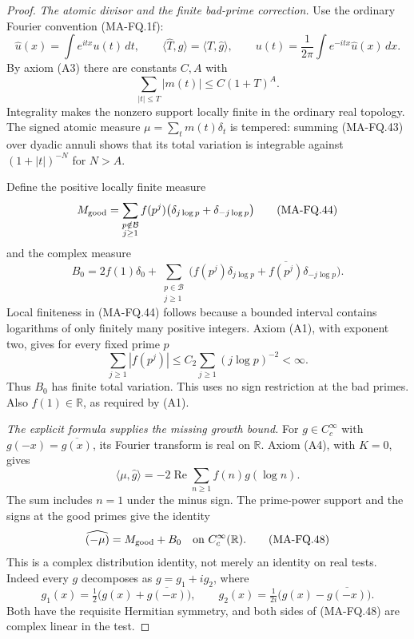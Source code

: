 \begin{proof}
\emph{The atomic divisor and the finite bad-prime correction.}
Use the ordinary Fourier convention (MA-FQ.1f):
\[
 \widehat u(x)=\int e^{itx}u(t)\,dt,\qquad
 \langle\widehat T,g\rangle=\langle T,\widehat g\rangle,
 \qquad
 u(t)=\frac1{2\pi}\int e^{-itx}\widehat u(x)\,dx.
 \tag{MA-FQ.42}
\]
By axiom (A3) there are constants $C,A$ with
\[
 \sum_{|t|\le T}|m(t)|\le C(1+T)^A.
 \tag{MA-FQ.43}
\]
Integrality makes the nonzero support locally finite in
the ordinary real topology. The signed atomic measure
$\mu=\sum_t m(t)\delta_t$ is tempered: summing (MA-FQ.43)
over dyadic annuli shows that its total variation is
integrable against $(1+|t|)^{-N}$ for $N>A$.

Define the positive locally finite measure
\[
 M_{\rm good}
   =\sum_{\substack{p\notin\mathcal B\\j\ge1}}
        f(p^j)\bigl(\delta_{j\log p}+\delta_{-j\log p}\bigr)
 \tag{MA-FQ.44}
\]
and the complex measure
\[
 B_0=2f(1)\delta_0+
    \sum_{\substack{p\in\mathcal B\\j\ge1}}
       \bigl(f(p^j)\delta_{j\log p}
                    +\overline{f(p^j)}\delta_{-j\log p}\bigr).
 \tag{MA-FQ.45}
\]
Local finiteness in (MA-FQ.44) follows because a bounded
interval contains logarithms of only finitely many
positive integers. Axiom (A1), with exponent two, gives
for every fixed prime $p$
\[
 \sum_{j\ge1}|f(p^j)|
       \le C_2\sum_{j\ge1}(j\log p)^{-2}<\infty.
 \tag{MA-FQ.46}
\]
Thus $B_0$ has finite total variation. This uses no sign
restriction at the bad primes. Also $f(1)\in\mathbb R$,
as required by (A1).

\emph{The explicit formula supplies the missing growth bound.}
For $g\in C_c^\infty$ with $g(-x)=\overline{g(x)}$,
its Fourier transform is real on $\mathbb R$.
Axiom (A4), with $K=0$, gives
\[
 \langle\mu,\widehat g\rangle
            =-2\operatorname{Re}
                    \sum_{n\ge1}f(n)g(\log n).
 \tag{MA-FQ.47}
\]
The sum includes $n=1$ under the minus sign. The
prime-power support and the signs at the good primes
give the identity
\[
                 \widehat{(-\mu)}=M_{\rm good}+B_0
                    \quad\text{on }C_c^\infty(\mathbb R).
 \tag{MA-FQ.48}
\]
This is a complex distribution identity, not merely an
identity on real tests. Indeed every $g$ decomposes as
$g=g_1+ig_2$, where
\[
 g_1(x)=\tfrac12\bigl(g(x)+\overline{g(-x)}\bigr),\qquad
 g_2(x)=\tfrac1{2i}\bigl(g(x)-\overline{g(-x)}\bigr).
 \tag{MA-FQ.49}
\]
Both have the requisite Hermitian symmetry, and both
sides of (MA-FQ.48) are complex linear in the test.


\end{proof}
